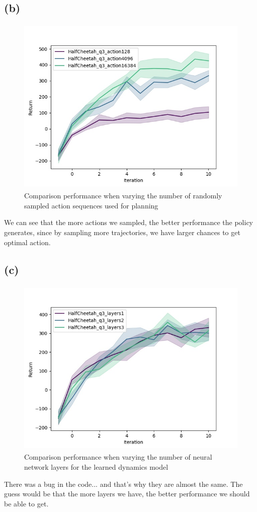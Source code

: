 \documentclass[12pt]{article}
\begin{document}
\subsection*{(b)}
\begin{figure}[H]
  \centering
  \includegraphics[height=3.4in]{HalfCheetah_q3_actions.jpg}
  \caption{Comparison performance when varying the number of randomly sampled action sequences used for planning}
\end{figure}
We can see that the more actions we sampled, the better performance the policy generates, since by sampling more trajectories, we have larger chances to get optimal action.


\subsection*{(c)}
\begin{figure}[H]
  \centering
  \includegraphics[height=3.4in]{HalfCheetah_q3_nn_layers.jpg}
  \caption{Comparison performance when varying the number of neural network layers for the learned dynamics model}
\end{figure}
There was a bug in the code... and that's why they are almost the same. The guess would be that the more layers we have, the better performance we should be able to get.
\end{document}
